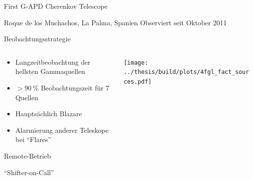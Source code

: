 \documentclass[aspectratio=1610, 9pt]{beamer}
\begin{document}
\begin{frame}[b]{First G-APD Cherenkov Telescope}
  \centering
  
  Roque de los Muchachos, La Palma, Spanien \hspace{1cm}Observiert seit Oktober 2011
\end{frame}


\begin{frame}{Beobachtungsstrategie}
  \begin{columns}[onlytextwidth, c]
    \begin{column}{0.3\textwidth}
      \begin{itemize}
        \item Langzeitbeobachtung der hellsten Gammaquellen
        \item $> \SI{90}{\percent}$ Beobachtungszeit für 7 Quellen
        \item Hauptsächlich Blazare
        \item Alarmierung anderer Teleskope bei \enquote{Flares}
      \end{itemize}

      \begin{description}[Seit 2017]
        \item[Seit 2012] Remote-Betrieb
        \item[Seit 2017] \enquote{Shifter-on-Call}
      \end{description}
    \end{column}%
    \hfill%
    \begin{column}{0.65\textwidth}%
      \texttt{[image: ../thesis/build/plots/4fgl\_fact\_sources.pdf]}%
    \end{column}%
  \end{columns}%
\end{frame}
\end{document}
